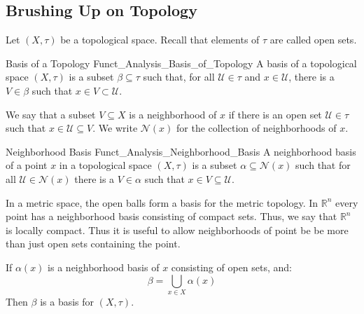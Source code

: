         \subsection{Brushing Up on Topology}
            Let $(X,\tau)$ be a topological space. Recall that
            elements of $\tau$ are called open sets.
            \begin{ldefinition}{Basis of a Topology}
                  {Funct_Analysis_Basis_of_Topology}
                A basis of a topological space $(X,\tau)$ is a
                subset $\beta\subseteq\tau$ such that, for all
                $\mathcal{U}\in\tau$ and $x\in\mathcal{U}$, there
                is a $V\in\beta$ such that
                $x\in{V}\subset\mathcal{U}$.
            \end{ldefinition}
            We say that a subset $V\subseteq{X}$ is a neighborhood
            of $x$ if there is an open set
            $\mathcal{U}\in\tau$ such that
            $x\in\mathcal{U}\subseteq{V}$. We write
            $\mathscr{N}(x)$ for the collection of neighborhoods
            of $x$.
            \begin{ldefinition}{Neighborhood Basis}
                  {Funct_Analysis_Neighborhood_Basis}
                A neighborhood basis of a point $x$ in a topological
                space $(X,\tau)$ is a subset
                $\alpha\subseteq\mathscr{N}(x)$ such that
                for all $\mathcal{U}\in\mathscr{N}(x)$ there is
                a $V\in\alpha$ such that
                $x\in{V}\subseteq\mathcal{U}$.
            \end{ldefinition}
            \begin{lexample}
                In a metric space, the open balls form
                a basis for the metric topology. In $\mathbb{R}^{n}$
                every point has a neighborhood basis consisting of
                compact sets. Thus, we say that $\mathbb{R}^{n}$
                is locally compact. Thus it is useful to allow
                neighborhoods of point be be more than just open
                sets containing the point.
            \end{lexample}
            \begin{theorem}
                If $\alpha(x)$ is a neighborhood basis of
                $x$ consisting of open sets, and:
                \begin{equation}
                    \beta=\bigcup_{x\in{X}}\alpha(x)
                \end{equation}
                Then $\beta$ is a basis for $(X,\tau)$.
            \end{theorem}
